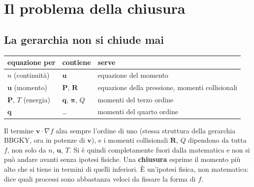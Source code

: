 \section{Il problema della chiusura}

\subsection{La gerarchia non si chiude mai}
\begin{center}
\small
\begin{tabular}{|l|l|l|}
\hline
equazione per & contiene & serve\\
\hline
$n$ (continuità) & $\mathbf{u}$ & equazione del momento\\
\hline
$\mathbf{u}$ (momento) & $\mathbf{P}$, $\mathbf{R}$ & equazione della pressione, momenti collisionali\\
\hline
$\mathbf{P}$, $T$ (energia) & $\mathbf{q}$, $\boldsymbol\pi$, $Q$ & momenti del terzo ordine\\
\hline
$\mathbf{q}$ & \dots & momenti del quarto ordine\\
\hline
\end{tabular}
\end{center}
Il termine $\mathbf{v}\cdot\nabla f$ alza sempre l'ordine di uno (stessa struttura della gerarchia BBGKY, ora in potenze di $\mathbf{v}$), e i momenti collisionali $\mathbf{R}$, $Q$ dipendono da tutta $f$, non solo da $n$, $\mathbf{u}$, $T$. Si è quindi completamente fuori dalla matematica e non si può andare avanti senza ipotesi fisiche.
Una \textbf{chiusura} esprime il momento più alto che si tiene in termini di quelli inferiori. È un'ipotesi fisica, non matematica: dice quali processi sono abbastanza veloci da fissare la forma di $f$.

